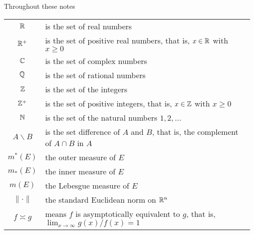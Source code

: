 Throughout these notes

\begin{tabular}{cl}
  $\mathbb{R}$ & is the set of real numbers\\
  $\mathbb{R}^+$ & is the set of positive real numbers, that is, $x\in\mathbb{R}$ with
             $x\geq 0$\\
  $\mathbb{C}$ & is the set of complex numbers\\
  $\mathbb{Q}$ & is the set of rational numbers\\
  $\mathbb{Z}$ & is the set of the integers\\
  $\mathbb{Z}^+$ & is the set of positive integers, that is, $x\in\mathbb{Z}$ with
             $x\geq 0$\\
  $\mathbb{N}$ & is the set of the natural numbers $1,2,\dotsc$\\
  $A\smallsetminus B$ & is the set difference of $A$ and $B$, that is, the
                        complement of $A\cap B$ in $A$\\
  $m^*(E)$ & the outer measure of $E$\\
  $m_*(E)$ & the inner measure of $E$\\
  $m(E)$ & the Lebesgue measure of $E$\\
  $\|\cdot\|$ & the standard Euclidean norm on $\mathbb{R}^n$\\
  $f\asymp g$ & means $f$ is asymptotically equivalent to $g$, that is,
                $\lim_{x\to\infty} g(x)/f(x)=1$\\
\end{tabular}

\newpage

